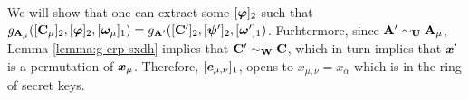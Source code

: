 

We will show that one can extract some $[{\boldsymbol{\varphi}}]_2$ such that $g_{\mathbf{{A}}_\mu}([\mathbf{{C}}_\mu]_2,[{\boldsymbol{\varphi}}]_2,[{\boldsymbol{\omega}}_\mu]_1) =g_{\mathbf{{A}}'}([\mathbf{{C}}']_2,[{\boldsymbol{\psi}}']_2,[{\boldsymbol{\omega}}']_1)$. Furhtermore,
since $\mathbf{{A}}'\sim_{\mathbf{{U}}}\mathbf{{A}}_\mu$, Lemma \ref{lemma:g-crp-sxdh} implies that $\mathbf{{C}}'\sim_{\mathbf{{W}}}\mathbf{{C}}$, which in turn implies that ${\boldsymbol{x}}'$ is a permutation of ${\boldsymbol{x}}_\mu$. Therefore, $[{\boldsymbol{c}}_{\mu,\nu}]_1$, opens to $x_{\mu,\nu}=x_\alpha$ which is in the ring of secret keys.